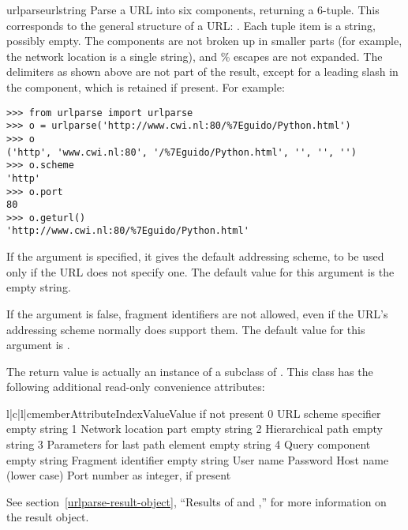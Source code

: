 \begin{funcdesc}{urlparse}{urlstring}
Parse a URL into six components, returning a 6-tuple.  This
corresponds to the general structure of a URL:
.
Each tuple item is a string, possibly empty.
The components are not broken up in smaller parts (for example, the network
location is a single string), and \% escapes are not expanded.
The delimiters as shown above are not part of the result,
except for a leading slash in the  component, which is
retained if present.  For example:

\begin{verbatim}
>>> from urlparse import urlparse
>>> o = urlparse('http://www.cwi.nl:80/%7Eguido/Python.html')
>>> o
('http', 'www.cwi.nl:80', '/%7Eguido/Python.html', '', '', '')
>>> o.scheme
'http'
>>> o.port
80
>>> o.geturl()
'http://www.cwi.nl:80/%7Eguido/Python.html'
\end{verbatim}

If the  argument is specified, it gives the
default addressing scheme, to be used only if the URL does not
specify one.  The default value for this argument is the empty string.

If the  argument is false, fragment identifiers
are not allowed, even if the URL's addressing scheme normally does
support them.  The default value for this argument is .

The return value is actually an instance of a subclass of
.  This class has the following additional read-only
convenience attributes:

\begin{tableiv}{l|c|l|c}{member}{Attribute}{Index}{Value}{Value if not present}
    {0} {URL scheme specifier}             {empty string}
    {1} {Network location part}            {empty string}
      {2} {Hierarchical path}                {empty string}
    {3} {Parameters for last path element} {empty string}
     {4} {Query component}                  {empty string}
   {Fragment identifier}              {empty string}
   {User name}                        {}
   {Password}                         {}
   {Host name (lower case)}           {}
      { } {Port number as integer, if present} {}
\end{tableiv}

See section~\ref{urlparse-result-object}, ``Results of
 and ,'' for more
information on the result object.

\end{funcdesc}

